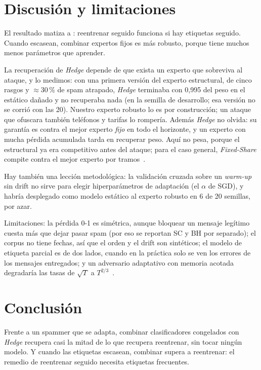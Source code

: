 \documentclass[10pt,twocolumn,a4paper]{article}
\begin{document}
\section{Discusión y limitaciones}

El resultado matiza a \citet{lowd2005goodword}: reentrenar seguido funciona si hay etiquetas
seguido. Cuando escasean, combinar expertos fijos es más robusto, porque tiene muchos menos
parámetros que aprender.

La recuperación de \emph{Hedge} depende de que exista un experto que sobreviva al ataque, y lo
medimos: con una primera versión del experto estructural, de cinco rasgos y $\approx 30$\,\% de
spam atrapado, \emph{Hedge} terminaba con 0,995 del peso en el estático dañado y no recuperaba nada
(en la semilla de desarrollo; esa versión no se corrió con las 20).
Nuestro experto robusto lo es por construcción; un ataque que ofuscara también teléfonos y tarifas
lo rompería. Además \emph{Hedge} no olvida: su garantía es contra el mejor experto \emph{fijo} en
todo el horizonte, y un experto con mucha pérdida acumulada tarda en recuperar peso. Aquí no pesa,
porque el estructural ya era competitivo antes del ataque; para el caso general, \emph{Fixed-Share}
compite contra el mejor experto por tramos~\cite{herbster1998tracking}.

Hay también una lección metodológica: la validación cruzada sobre un \emph{warm-up} sin drift no
sirve para elegir hiperparámetros de adaptación (el $\alpha$ de SGD), y habría desplegado como
modelo estático al experto robusto en 6 de 20 semillas, por azar.

Limitaciones: la pérdida 0-1 es simétrica, aunque bloquear un mensaje legítimo cuesta más que dejar
pasar spam (por eso se reportan SC y BH por separado); el corpus no tiene fechas, así que el orden y
el drift son sintéticos; el modelo de etiqueta parcial es de dos lados, cuando en la práctica solo se
ven los errores de los mensajes entregados; y un adversario adaptativo con memoria acotada
degradaría las tasas de $\sqrt{T}$ a $T^{2/3}$~\cite{cesabianchi2013switching}.

\section{Conclusión}

Frente a un spammer que se adapta, combinar clasificadores congelados con \emph{Hedge} recupera
casi la mitad de lo que recupera reentrenar, sin tocar ningún modelo. Y cuando las etiquetas
escasean, combinar supera a reentrenar: el remedio de reentrenar seguido necesita etiquetas
frecuentes.

{\small


}
\end{document}
